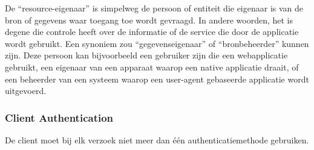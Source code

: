 De ``resource-eigenaar'' is simpelweg de persoon of entiteit die eigenaar is van de bron of gegevens waar toegang toe wordt gevraagd. In andere woorden,
het is degene die controle heeft over de informatie of de service die door de applicatie wordt gebruikt. Een synoniem zou ``gegevenseigenaar'' of 
``bronbeheerder'' kunnen zijn. Deze persoon kan bijvoorbeeld een gebruiker zijn die een webapplicatie gebruikt, een eigenaar van een apparaat waarop 
een native applicatie draait, of een beheerder van een systeem waarop een user-agent gebaseerde applicatie wordt uitgevoerd.

\subsubsection{Client Authentication}
\label{subsubsec:client-authentication}
De client moet bij elk verzoek niet meer dan één authenticatiemethode gebruiken.


